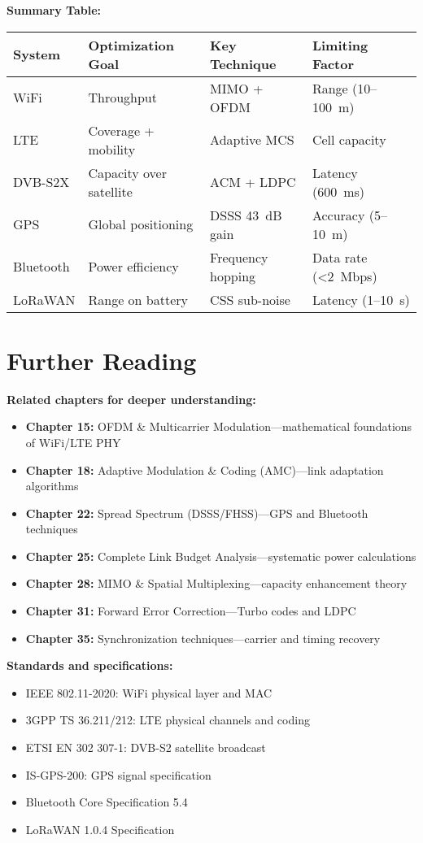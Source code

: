 \textbf{Summary Table:}

\begin{center}
\begin{tabularx}{\textwidth}{@{}lXXX@{}}
\toprule
\textbf{System} & \textbf{Optimization Goal} & \textbf{Key Technique} & \textbf{Limiting Factor} \\
\midrule
WiFi & Throughput & MIMO + OFDM & Range (10--100~m) \\
LTE & Coverage + mobility & Adaptive MCS & Cell capacity \\
DVB-S2X & Capacity over satellite & ACM + LDPC & Latency (600~ms) \\
GPS & Global positioning & DSSS 43~dB gain & Accuracy (5--10~m) \\
Bluetooth & Power efficiency & Frequency hopping & Data rate (<2~Mbps) \\
LoRaWAN & Range on battery & CSS sub-noise & Latency (1--10~s) \\
\bottomrule
\end{tabularx}
\end{center}

\section{Further Reading}

\textbf{Related chapters for deeper understanding:}

\begin{itemize}
\item \textbf{Chapter 15:} OFDM \& Multicarrier Modulation---mathematical foundations of WiFi/LTE PHY
\item \textbf{Chapter 18:} Adaptive Modulation \& Coding (AMC)---link adaptation algorithms
\item \textbf{Chapter 22:} Spread Spectrum (DSSS/FHSS)---GPS and Bluetooth techniques
\item \textbf{Chapter 25:} Complete Link Budget Analysis---systematic power calculations
\item \textbf{Chapter 28:} MIMO \& Spatial Multiplexing---capacity enhancement theory
\item \textbf{Chapter 31:} Forward Error Correction---Turbo codes and LDPC
\item \textbf{Chapter 35:} Synchronization techniques---carrier and timing recovery
\end{itemize}

\textbf{Standards and specifications:}

\begin{itemize}
\item IEEE 802.11-2020: WiFi physical layer and MAC
\item 3GPP TS 36.211/212: LTE physical channels and coding
\item ETSI EN 302 307-1: DVB-S2 satellite broadcast
\item IS-GPS-200: GPS signal specification
\item Bluetooth Core Specification 5.4
\item LoRaWAN 1.0.4 Specification
\end{itemize}
